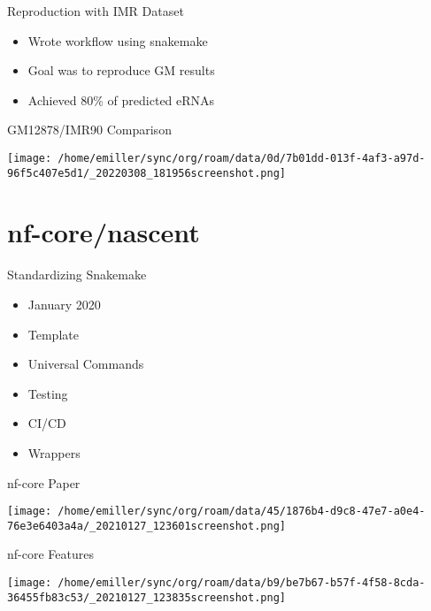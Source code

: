 \documentclass[bigger]{beamer}
\begin{document}
\begin{frame}[label={sec:org9e232a2}]{Reproduction with IMR Dataset}
\begin{itemize}
\item Wrote workflow using snakemake
\item Goal was to reproduce GM results
\item Achieved 80\% of predicted eRNAs
\end{itemize}
\end{frame}

\begin{frame}[label={sec:orgb0caca4}]{GM12878/IMR90 Comparison}
\begin{center}
\texttt{[image: /home/emiller/sync/org/roam/data/0d/7b01dd-013f-4af3-a97d-96f5c407e5d1/\_20220308\_181956screenshot.png]}
\end{center}
\end{frame}


\section{nf-core/nascent}
\label{sec:orgea39042}

\begin{frame}[label={sec:org37d56a9}]{Standardizing Snakemake}
\begin{itemize}
\item January 2020
\item Template
\item Universal Commands
\item Testing
\item CI/CD
\item Wrappers
\end{itemize}
\end{frame}

\begin{frame}[label={sec:orgd7dea16}]{nf-core Paper}
\begin{center}
\texttt{[image: /home/emiller/sync/org/roam/data/45/1876b4-d9c8-47e7-a0e4-76e3e6403a4a/\_20210127\_123601screenshot.png]}
\end{center}
\end{frame}

\begin{frame}[label={sec:org1872e39}]{nf-core Features}
\begin{center}
\texttt{[image: /home/emiller/sync/org/roam/data/b9/be7b67-b57f-4f58-8cda-36455fb83c53/\_20210127\_123835screenshot.png]}
\end{center}
\end{frame}
\end{document}
